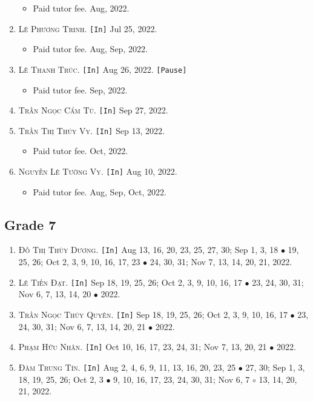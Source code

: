 \documentclass{article}
\numberwithin{equation}{section}
\begin{document}
\begin{enumerate}
	\begin{itemize}
		\item \textsf{Paid tutor fee.} Aug, 2022.
	\end{itemize}
	\item \textsc{Lê Phương Trinh.} \texttt{[In]} Jul 25, 2022.
	\begin{itemize}
		\item \textsf{Paid tutor fee.} Aug, Sep, 2022.
	\end{itemize}
	\item \textsc{Lê Thanh Trúc.} \texttt{[In]} Aug 26, 2022. \texttt{[Pause]}
	\begin{itemize}
		\item \textsf{Paid tutor fee.} Sep, 2022.
	\end{itemize}
	\item \textsc{Trần Ngọc Cẩm Tú.} \texttt{[In]} Sep 27, 2022.
	\item \textsc{Trần Thị Thúy Vy.} \texttt{[In]} Sep 13, 2022.
	\begin{itemize}
		\item \textsf{Paid tutor fee.} Oct, 2022.
	\end{itemize}
	\item \textsc{Nguyễn Lê Tường Vy.} \texttt{[In]} Aug 10, 2022.
	\begin{itemize}
		\item \textsf{Paid tutor fee.} Aug, Sep, Oct, 2022.
	\end{itemize}
\end{enumerate}

\subsection{Grade 7}
\begin{enumerate}
	\item \textsc{Đỗ Thị Thùy Dương.} \texttt{[In]} Aug 13, 16, 20, 23, 25, 27, 30; Sep 1, 3, 18 $\bullet$ 19, 25, 26; Oct 2, 3, 9, 10, 16, 17, 23 $\bullet$ 24, 30, 31; Nov 7, 13, 14, 20, 21, 2022.
	\item \textsc{Lê Tiến Đạt.} \texttt{[In]} Sep 18, 19, 25, 26; Oct 2, 3, 9, 10, 16, 17 $\bullet$ 23, 24, 30, 31; Nov 6, 7, 13, 14, 20 $\bullet$ 2022.
	\item \textsc{Trần Ngọc Thúy Quyên.} \texttt{[In]} Sep 18, 19, 25, 26; Oct 2, 3, 9, 10, 16, 17 $\bullet$ 23, 24, 30, 31; Nov 6, 7, 13, 14, 20, 21 $\bullet$ 2022.
	\item \textsc{Phạm Hữu Nhân.} \texttt{[In]} Oct 10, 16, 17, 23, 24, 31; Nov 7, 13, 20, 21 $\bullet$ 2022.
	\item \textsc{Đàm Trung Tín.} \texttt{[In]} Aug 2, 4, 6, 9, 11, 13, 16, 20, 23, 25 $\bullet$ 27, 30; Sep 1, 3, 18, 19, 25, 26; Oct 2, 3 $\bullet$ 9, 10, 16, 17, 23, 24, 30, 31; Nov 6, 7 $\circ$ 13, 14, 20, 21, 2022.
\end{enumerate}
\end{document}
